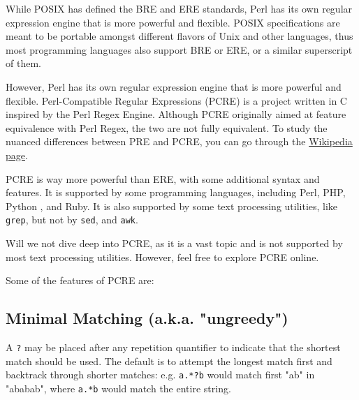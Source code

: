 While POSIX has defined the BRE and ERE standards, Perl has its own regular expression engine that is more powerful and flexible. POSIX
specifications are meant to be portable amongst different flavors of Unix and other languages, thus most programming languages also support BRE or ERE, or a similar superscript of them.

However, Perl has its own regular expression engine that is more powerful and flexible. Perl-Compatible Regular Expressions (PCRE) is a project written in C inspired by the Perl Regex Engine. Although PCRE originally aimed at feature equivalence with Perl Regex, the two are not fully equivalent. To study the nuanced differences between PRE and PCRE, you can go through the
\href{https://en.wikipedia.org/wiki/Perl\_Compatible\_Regular\_Expressions}{Wikipedia page}.

PCRE is way more powerful than ERE, with some additional syntax and features. It is supported by some programming languages, including Perl, PHP, Python
, and Ruby.
It is also supported by some text processing utilities, like \lstinline|grep|, but not by \lstinline|sed|, and \lstinline|awk|.

Will we not dive deep into PCRE, as it is a vast topic and is not supported by most text processing utilities. However, feel free to explore PCRE online.

Some of the features of PCRE are:

\subsection{Minimal Matching (a.k.a. "ungreedy")}

A \lstinline|?| may be placed after any repetition quantifier to indicate that the shortest match should be used. The default is to attempt the longest match first and backtrack through shorter matches: e.g. \lstinline|a.*?b| would match first "ab" in "ababab", where \lstinline|a.*b| would match the entire string.


